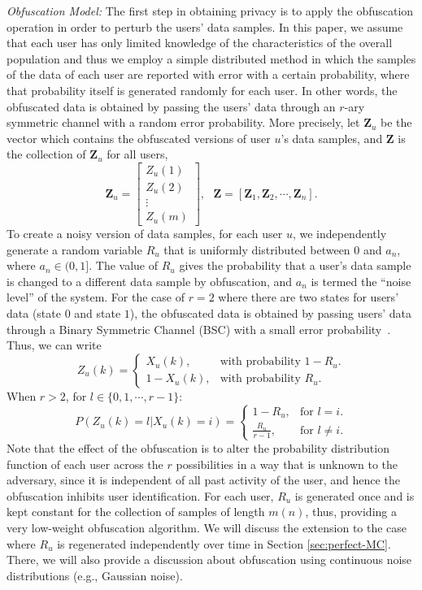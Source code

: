 \textit{Obfuscation Model:} The first step in obtaining privacy is to apply the obfuscation operation in order to perturb the users' data samples. In this paper, we assume that each user has only limited knowledge of the characteristics of the overall population and thus we employ a simple distributed method in which the samples of the data of each user are reported with error with a certain probability, where that probability itself is generated randomly for each user. In other words, the obfuscated data is obtained by passing the users' data through an $r$-ary symmetric channel with a random error probability. More precisely, let $\textbf{Z}_u$ be the vector which contains
the obfuscated versions of user $u$'s data samples, and $\textbf{Z}$ is the collection of $\textbf{Z}_u$ for all users,
\[\textbf{Z}_u = \begin{bmatrix}
Z_u(1) \\ Z_u(2) \\ \vdots \\Z_u(m) \end{bmatrix} , \ \ \  \textbf{Z} =\left[ \textbf{Z}_{1}, \textbf{Z}_{2}, \cdots,  \textbf{Z}_{n}\right].
\]
To create a noisy version of data samples, for each user $u$, we independently generate a random variable $R_u$ that is uniformly distributed between $0$ and $a_n$, where $a_n \in (0,1]$. The value of $R_u$ gives the probability that a user's data sample is changed to a different data sample by obfuscation, and $a_n$ is termed the ``noise level'' of the system. For the case of $r=2$ where there are two states for users' data (state $0$ and state $1$), the obfuscated data is obtained by passing users' data through a Binary Symmetric Channel (BSC) with a small error probability~\cite{randomizedresponse}. Thus, we can write
\[
{Z}_{u}(k)=\begin{cases}
{X}_{u}(k), & \textrm{with probability } 1-R_u.\\
1-{X}_{u}(k),& \textrm{with probability } R_u.
\end{cases}
\]
When $r>2$, for $l \in \{0,1,\cdots, r-1\}$:
\[
P({Z}_{u}(k)=l| X_{u}(k)=i) =\begin{cases}
1-R_u, & \textrm{for } l=i.\\
\frac{R_u}{r-1}, & \textrm{for } l \neq i.
\end{cases}
\]
Note that the effect of the obfuscation is to alter the probability distribution function of each user across the $r$ possibilities in a way that is unknown to the adversary, since it is independent of all past activity of the user, and hence the obfuscation inhibits user identification. For each user, $R_u$ is generated once and is kept constant for the collection of samples of length $m(n)$, thus, providing a very low-weight obfuscation algorithm. We will discuss the extension to the case where $R_u$ is regenerated independently over time in Section \ref{sec:perfect-MC}. There, we will also provide a discussion about obfuscation using continuous noise distributions (e.g., Gaussian noise).

